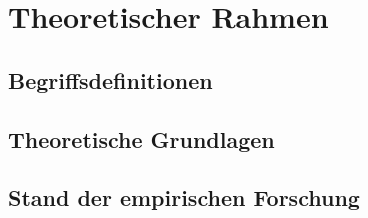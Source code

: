 \chapter{Theoretischer Rahmen}\label{chap:theorie}

\section{Begriffsdefinitionen}\label{sec:begriffe}

\section{Theoretische Grundlagen}\label{sec:grundlagen}

\section{Stand der empirischen Forschung}\label{sec:empforschung}
